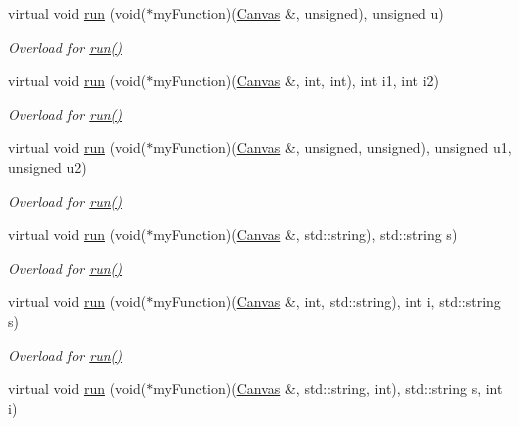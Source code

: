 \begin{DoxyCompactItemize}
virtual void \hyperlink{classtsgl_1_1_canvas_a67b341ead1fde0a692281d2b1f67be1e}{run} (void($\ast$my\+Function)(\hyperlink{classtsgl_1_1_canvas}{Canvas} \&, unsigned), unsigned u)
\begin{DoxyCompactList}\small\item\em Overload for \hyperlink{classtsgl_1_1_canvas_a5f3f00d6c380a662a239077456045502}{run()} \end{DoxyCompactList}\item 
virtual void \hyperlink{classtsgl_1_1_canvas_a768c10737f9590a25d8e66dcc7137d9b}{run} (void($\ast$my\+Function)(\hyperlink{classtsgl_1_1_canvas}{Canvas} \&, int, int), int i1, int i2)
\begin{DoxyCompactList}\small\item\em Overload for \hyperlink{classtsgl_1_1_canvas_a5f3f00d6c380a662a239077456045502}{run()} \end{DoxyCompactList}\item 
virtual void \hyperlink{classtsgl_1_1_canvas_ab146e6cf9f7f19a047c20c02a0eb30f9}{run} (void($\ast$my\+Function)(\hyperlink{classtsgl_1_1_canvas}{Canvas} \&, unsigned, unsigned), unsigned u1, unsigned u2)
\begin{DoxyCompactList}\small\item\em Overload for \hyperlink{classtsgl_1_1_canvas_a5f3f00d6c380a662a239077456045502}{run()} \end{DoxyCompactList}\item 
virtual void \hyperlink{classtsgl_1_1_canvas_a2eeece8d4c4453ec7b4b53e209004559}{run} (void($\ast$my\+Function)(\hyperlink{classtsgl_1_1_canvas}{Canvas} \&, std\+::string), std\+::string s)
\begin{DoxyCompactList}\small\item\em Overload for \hyperlink{classtsgl_1_1_canvas_a5f3f00d6c380a662a239077456045502}{run()} \end{DoxyCompactList}\item 
virtual void \hyperlink{classtsgl_1_1_canvas_ac507bbbf60328de2fc99f93cd37d04ec}{run} (void($\ast$my\+Function)(\hyperlink{classtsgl_1_1_canvas}{Canvas} \&, int, std\+::string), int i, std\+::string s)
\begin{DoxyCompactList}\small\item\em Overload for \hyperlink{classtsgl_1_1_canvas_a5f3f00d6c380a662a239077456045502}{run()} \end{DoxyCompactList}\item 
virtual void \hyperlink{classtsgl_1_1_canvas_aafed71cba89b059629647e77ba23ff2b}{run} (void($\ast$my\+Function)(\hyperlink{classtsgl_1_1_canvas}{Canvas} \&, std\+::string, int), std\+::string s, int i)

\end{DoxyCompactItemize}
